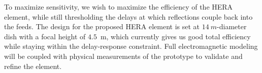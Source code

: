 \documentclass[preprint]{aastex}
\begin{document}
%
%

To maximize sensitivity, we wish to maximize the efficiency of the
HERA element, while still thresholding the delays at which reflections couple
back into the feeds. The design for the proposed HERA element is set
at $14~m$-diameter dish with a focal height of $4.5$~m, which currently gives us
good total efficiency %
while staying within the delay-response constraint. 
Full electromagnetic modeling will be coupled with 
physical measurements of the prototype to validate and refine the element.


\end{document}

